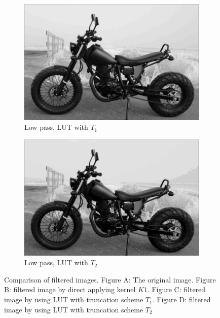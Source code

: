 \documentclass[12pt]{amsart}
\theoremstyle{definition}
\theoremstyle{remark}
\numberwithin{thm}{section}
\begin{document}
\begin{figure}[h]
\begin{subfigure}[b]{0.4\textwidth} \includegraphics[width=\textwidth]{motor_lut_212.png} \caption{Low pass, LUT with $T_1$} %
\end{subfigure}
\begin{subfigure}[b]{0.4\textwidth} \includegraphics[width=\textwidth]{motor_lut_424.png} \caption{Low pass, LUT with $T_2$} \end{subfigure}
\caption{Comparison of filtered images. Figure A: The original image. Figure B: filtered image by direct applying kernel $K1$. Figure C: filtered image by using LUT with truncation scheme $T_1$. Figure D: filtered image by using LUT with truncation scheme $T_2$}
\label{fig:motor} 
\end{figure}
\end{document}
